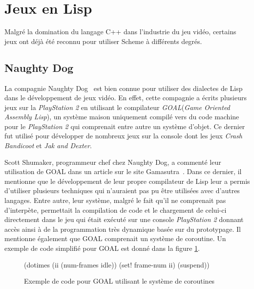 \documentclass[12pt,oneside,letterpaper,francais]{book}
\begin{document}
\section{Jeux en Lisp}

Malgré la domination du langage C++ dans l'industrie du jeu vidéo,
certains jeux ont déjà été reconnu pour utiliser Scheme à différents
degrés.


\subsection{Naughty Dog}


La compagnie Naughty Dog~\cite{ND} est bien connue pour utiliser des
dialectes de Lisp dans le développement de jeux vidéo. En effet, cette
compagnie a écrits plusieurs jeux sur la \textit{PlayStation 2} en
utilisant le compilateur \textit{GOAL}(\textit{Game Oriented Assembly
  Lisp}), un système maison uniquement compilé vers du code machine
pour le \textit{PlayStation 2} qui comprenait entre autre un système
d'objet. Ce dernier fut utilisé pour développer de nombreux jeux sur
la console dont les jeux \textit{Crash Bandicoot} et \textit{Jak and
  Dexter}.

Scott Shumaker, programmeur chef chez Naughty Dog, a commenté leur
utilisation de GOAL dans un article sur le site
Gamasutra~\cite{ND_GOAL}. Dans ce dernier, il mentionne que le
développement de leur propre compilateur de Lisp leur a permis
d'utiliser plusieurs techniques qui n'auraient pas pu être utilisées
avec d'autres langages. Entre autre, leur système, malgré le fait
qu'il ne comprenait pas d'interpète, permettait la compilation de code
et le chargement de celui-ci directement dans le jeu qui était exécuté
sur une console \textit{PlayStation 2} donnant accès ainsi à de la
programmation très dynamique basée sur du prototypage. Il mentionne
également que GOAL comprenait un système de coroutine. Un exemple de
code simplifié pour GOAL est donné dans la figure \ref{Rev:goal}.

\begin{figure}[htb!]
  \begin{schemecode}
(dotimes (ii (num-frames idle))
  (set! frame-num ii)
  (suspend))
  \end{schemecode}
  \caption{Exemple de code pour GOAL utilisant le système de coroutines}
  \label{Rev:goal}
\end{figure}
\end{document}

